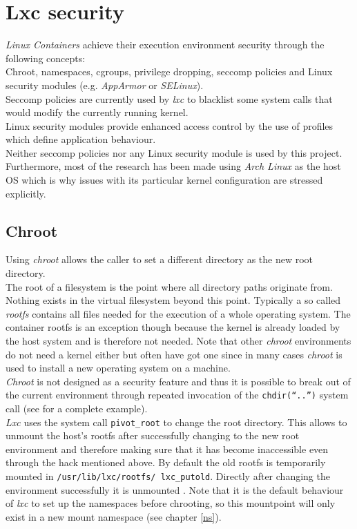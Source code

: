 \chapter{Lxc security}\label{features}

\textit{Linux Containers} achieve their execution environment security through the following concepts:\\
Chroot, namespaces, cgroups, privilege dropping, seccomp policies \cite{seccomp} and Linux security modules
(e.g. \textit{AppArmor}\cite{apparmor} or \textit{SELinux}\cite{seLinux}).\\
Seccomp policies are currently used by \textit{lxc} to blacklist some system calls that would modify the currently running kernel.\\
Linux security modules \cite{lsm} provide enhanced access control by the use of profiles which define application behaviour.\\
Neither seccomp policies nor any Linux security module is used by this project.\\
Furthermore, most of the research has been made using \textit{Arch Linux} as the host OS which is why issues with its particular
kernel configuration are stressed explicitly.

\section{Chroot}\label{rootfs}

Using \textit{chroot} allows the caller to set a different directory as the new root directory.\\
The root of a filesystem is the point where all directory paths originate from.
Nothing exists in the virtual filesystem beyond this point. Typically a so called \textit{rootfs} contains all files needed for
the execution of a whole operating system.
The container rootfs is an exception though because the kernel is already loaded by
the host system and is therefore not needed. Note that other \textit{chroot} environments do not need a kernel either but often have got one
since in many cases \textit{chroot} is used to install a new operating system on a machine.\\
\textit{Chroot} is not designed as a security feature and thus it is possible to break out of the current environment through
repeated invocation of the \texttt{chdir(``..'')} system call (see \cite{chrootbreak} for a complete example).\\
\textit{Lxc} uses the system call \texttt{pivot\_root} to change the root directory. This allows to unmount the host's rootfs after
successfully changing to the new root environment and therefore making sure that it has become inaccessible even through the hack
mentioned above.
By default the old rootfs is temporarily mounted in \texttt{/usr/lib/lxc/rootfs/ lxc\_putold}. Directly after changing the environment successfully
it is unmounted \cite{pivotsetup}. Note that it is the default behaviour of \textit{lxc} to set up the namespaces before chrooting, so this
mountpoint will only exist in a new mount namespace (see chapter \ref{ns}).

